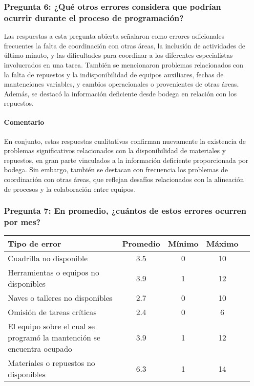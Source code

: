 \documentclass{article}
\begin{document}
\vspace{1.5em}
\subsubsection*{Pregunta 6: ¿Qué otros errores considera que podrían ocurrir durante el proceso de programación?}

Las respuestas a esta pregunta abierta señalaron como errores adicionales frecuentes la falta de coordinación con otras áreas, la inclusión de actividades de último minuto, y las dificultades para coordinar a los diferentes especialistas involucrados en una tarea. También se mencionaron problemas relacionados con la falta de repuestos y la indisponibilidad de equipos auxiliares, fechas de mantenciones variables, y cambios operacionales o provenientes de otras áreas. Además, se destacó la información deficiente desde bodega en relación con los repuestos.

\paragraph{Comentario} En conjunto, estas respuestas cualitativas confirman nuevamente la existencia de problemas significativos relacionados con la disponibilidad de materiales y repuestos, en gran parte vinculados a la información deficiente proporcionada por bodega. Sin embargo, también se destacan con frecuencia los problemas de coordinación con otras áreas, que reflejan desafíos relacionados con la alineación de procesos y la colaboración entre equipos.

\vspace{1.5em}
\subsubsection*{Pregunta 7: En promedio, ¿cuántos de estos errores ocurren por mes?}

\begin{table}[H]
    \centering
    \begin{tabular}{p{7cm}cccc}
        \toprule
        \textbf{Tipo de error} & \textbf{Promedio} & \textbf{Mínimo} & \textbf{Máximo} \\
        \midrule
        Cuadrilla no disponible & 3.5 & 0 & 10 \\
        Herramientas o equipos no disponibles & 3.9 & 1 & 12 \\
        Naves o talleres no disponibles & 2.7 & 0 & 10 \\
        Omisión de tareas críticas & 2.4 & 0 & 6 \\
        El equipo sobre el cual se programó la mantención se encuentra ocupado & 3.9 & 1 & 12 \\
        Materiales o repuestos no disponibles & 6.3 & 1 & 14 \\
        \bottomrule
    \end{tabular}
    \label{tab:errores_especificos}
\end{table}
\end{document}
